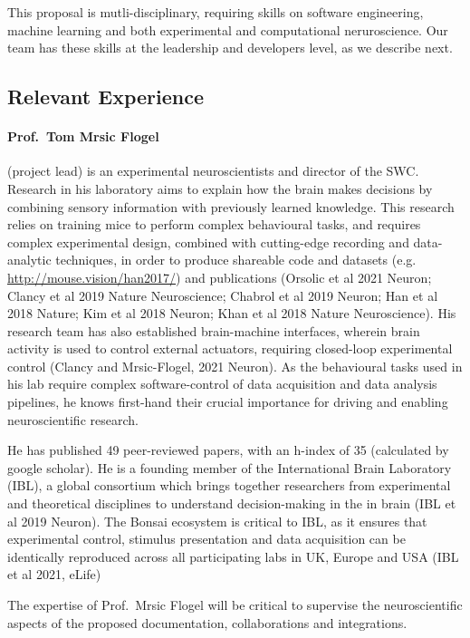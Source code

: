 
This proposal is mutli-disciplinary, requiring skills on software engineering,
machine learning and both experimental and computational neruroscience. Our
team has these skills at the leadership and developers level, as we describe
next.

\subsection*{Relevant Experience}

\paragraph{Prof.~Tom Mrsic Flogel} (project lead) is an experimental
neuroscientists and director of the SWC. Research in his laboratory aims to explain how the
brain makes decisions by combining sensory information with previously learned
knowledge. This research relies on training mice to perform complex behavioural
tasks, and requires complex experimental design, combined with cutting-edge
recording and data-analytic techniques, in order to produce shareable code and
datasets (e.g.
\href{http://mouse.vision/han2017/}{http://mouse.vision/han2017/}) and
publications (Orsolic et al 2021 Neuron; Clancy et al 2019 Nature Neuroscience;
Chabrol et al 2019 Neuron; Han et al 2018 Nature; Kim et al 2018 Neuron; Khan
et al 2018 Nature Neuroscience). His research team has also established brain-machine
interfaces, wherein brain activity is used to control external actuators,
requiring closed-loop experimental control (Clancy and Mrsic-Flogel, 2021
Neuron).  As the behavioural tasks used in his lab require complex
software-control of data acquisition and data analysis pipelines, he knows
first-hand their crucial importance for driving and enabling neuroscientific
research.

He has published 49 peer-reviewed papers, with an h-index of 35 (calculated by
google scholar).  He is a founding member of the International Brain
Laboratory (IBL), a global consortium which brings together researchers from
experimental and theoretical disciplines to understand decision-making in the
in brain (IBL et al 2019 Neuron). The Bonsai ecosystem is critical to IBL, as
it ensures that experimental control, stimulus presentation and data
acquisition can be identically reproduced across all participating labs in UK,
Europe and USA (IBL et al 2021, eLife)

The expertise of Prof.~Mrsic Flogel will be critical to supervise the
neuroscientific aspects of the proposed documentation, collaborations and
integrations.

